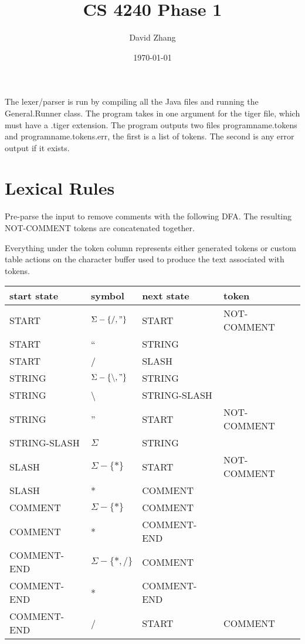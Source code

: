 \documentclass[11pt, fleqn]{article}
\begin{document}
\title{CS 4240 Phase 1}
\author{David Zhang}
\date{\today}

\newtheorem{Lemma}{Lemma}
\newtheorem{Theorem}{Theorem}
\maketitle

The lexer/parser is run by compiling all the Java files and running the General.Runner class.
The program takes in one argument for the tiger file, which must have a .tiger extension.
The program outputs two files programname.tokens and programname.tokens.err, the first is a list of tokens.
The second is any error output if it exists.

\section{Lexical Rules}

Pre-parse the input to remove comments with the following DFA. The resulting NOT-COMMENT tokens are concatenated together.

Everything under the token column represents either generated tokens or custom table actions on the character buffer used to produce the text associated with tokens.

\begin{longtable}{l|l|l|l}
start state		&	symbol							&	next	 state		&	token		 	\\
\hline
START			&	$\Sigma - \{/, "\}$				& 	START			&	NOT-COMMENT		\\
START			&	``								& 	STRING			&					\\
START			&	/								&	SLASH			&					\\
STRING			&	$\Sigma - \{\backslash, "\}$		& 	STRING			&					\\
STRING			&	\textbackslash					& 	STRING-SLASH		&					\\
STRING			&	''								& 	START			&	NOT-COMMENT		\\
STRING-SLASH		&	$\Sigma$							&	STRING			&					\\
SLASH			&	$\Sigma - \{*\}$					&	START			&	NOT-COMMENT		\\
SLASH			&	*								&	COMMENT			&					\\
COMMENT			&	$\Sigma - \{*\}$					&	COMMENT			&					\\
COMMENT			&	*								&	COMMENT-END		&					\\
COMMENT-END		&	$\Sigma - \{*, /\}$				&	COMMENT			&					\\
COMMENT-END		&	*								&	COMMENT-END		&					\\
COMMENT-END		&	/								&	START			&	COMMENT			\\
\end{longtable}
\end{document}
